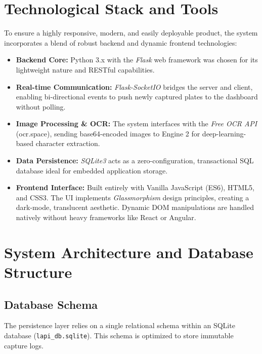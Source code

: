 \documentclass[conference]{IEEEtran}
\begin{document}
\section{Technological Stack and Tools}
To ensure a highly responsive, modern, and easily deployable product, the system incorporates a blend of robust backend and dynamic frontend technologies:
\begin{itemize}
    \item \textbf{Backend Core:} Python 3.x with the \textit{Flask} web framework was chosen for its lightweight nature and RESTful capabilities.
    \item \textbf{Real-time Communication:} \textit{Flask-SocketIO} bridges the server and client, enabling bi-directional events to push newly captured plates to the dashboard without polling.
    \item \textbf{Image Processing \& OCR:} The system interfaces with the \textit{Free OCR API} (ocr.space), sending base64-encoded images to Engine 2 for deep-learning-based character extraction.
    \item \textbf{Data Persistence:} \textit{SQLite3} acts as a zero-configuration, transactional SQL database ideal for embedded application storage.
    \item \textbf{Frontend Interface:} Built entirely with Vanilla JavaScript (ES6), HTML5, and CSS3. The UI implements \textit{Glassmorphism} design principles, creating a dark-mode, translucent aesthetic. Dynamic DOM manipulations are handled natively without heavy frameworks like React or Angular. 
\end{itemize}

\section{System Architecture and Database Structure}

\subsection{Database Schema}
The persistence layer relies on a single relational schema within an SQLite database (\texttt{lapi\_db.sqlite}). This schema is optimized to store immutable capture logs.
\end{document}
